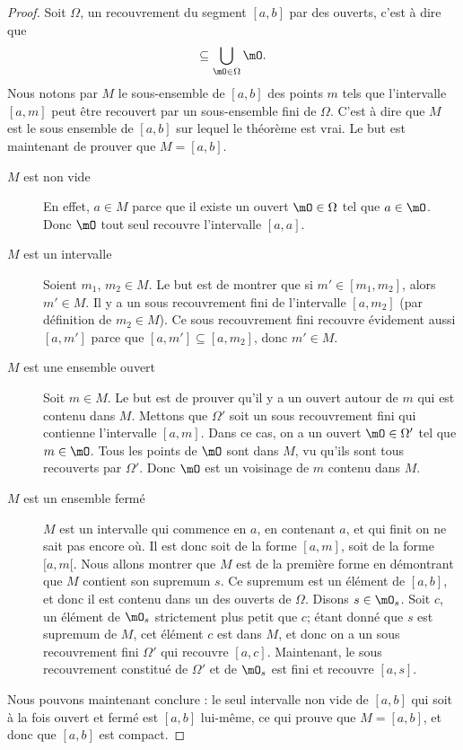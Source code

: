 \begin{proof}
    Soit $\Omega$, un recouvrement du segment $[a,b]$ par des ouverts, c'est à dire que
    \begin{equation}
        [a,b]\subseteq\bigcup_{\mO\in\Omega}\mO.
    \end{equation}
    Nous notons par $M$ le sous-ensemble de $[a,b]$ des points $m$ tels que l'intervalle $[a,m]$ peut être recouvert par un sous-ensemble fini de $\Omega$. C'est à dire que $M$ est le sous ensemble de $[a,b]$ sur lequel le théorème est vrai. Le but est maintenant de prouver que $M=[a,b]$.
    \begin{description}
        \item[$M$ est non vide] En effet, $a\in M$ parce que il existe un ouvert $\mO\in\Omega$ tel que $a\in\mO$. Donc $\mO$ tout seul recouvre l'intervalle $[a,a]$. 
        \item[$M$ est un intervalle] Soient $m_1$, $m_2\in M$. Le but est de montrer que si $m'\in[m_1,m_2]$, alors $m'\in M$. Il y a un sous recouvrement fini de l'intervalle $[a,m_2]$ (par définition de $m_2\in M$). Ce sous recouvrement fini recouvre évidement aussi $[a,m']$ parce que $[a,m']\subseteq [a,m_2]$, donc $m'\in M$.
        \item[$M$ est une ensemble ouvert] Soit $m\in M$. Le but est de prouver qu'il y a un ouvert autour de $m$ qui est contenu dans $M$. Mettons que $\Omega'$ soit un sous recouvrement fini qui contienne l'intervalle $[a,m]$. Dans ce cas, on a un ouvert $\mO\in\Omega'$ tel que $m\in\mO$. Tous les points de $\mO$ sont dans $M$, vu qu'ils sont tous recouverts par $\Omega'$. Donc $\mO$ est un voisinage de $m$ contenu dans $M$.
        \item[$M$ est un ensemble fermé] $M$ est un intervalle qui commence en $a$, en contenant $a$, et qui finit on ne sait pas encore où. Il est donc soit de la forme $[a,m]$, soit de la forme $[a,m[$. Nous allons montrer que $M$ est de la première forme en démontrant que $M$ contient son supremum $s$. Ce supremum est un élément de $[a,b]$, et donc il est contenu dans un des ouverts de $\Omega$. Disons $s\in\mO_s$. Soit $c$, un élément de $\mO_s$ strictement plus petit que $c$; étant donné que $s$ est supremum de $M$, cet élément $c$ est dans $M$, et donc on a un sous recouvrement fini $\Omega'$ qui recouvre $[a,c]$. Maintenant, le sous recouvrement constitué de $\Omega'$ et de $\mO_s$ est fini et recouvre $[a,s]$.
    \end{description}
    Nous pouvons maintenant conclure : le seul intervalle non vide de $[a,b]$ qui soit à la fois ouvert et fermé est $[a,b]$ lui-même, ce qui prouve que $M=[a,b]$, et donc que $[a,b]$ est compact.
\end{proof}

